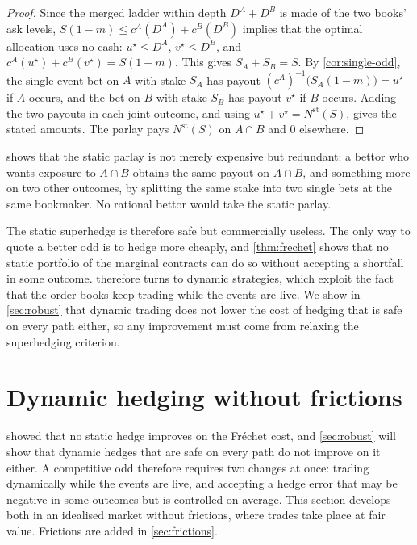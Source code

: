 \documentclass[11pt,a4paper]{article}
\theoremstyle{plain}
\theoremstyle{definition}
\theoremstyle{remark}
\newcommand{\1}{\mathbf{1}}
\begin{document}
\begin{proof}
Since the merged ladder within depth $D^A+D^B$ is made of the two books' ask levels, $S(1-m)\leq c^A(D^A)+c^B(D^B)$ implies that the optimal allocation uses no cash: $u^\star\leq D^A$, $v^\star\leq D^B$, and $c^A(u^\star) + c^B(v^\star) = S(1-m)$. This gives $S_A+S_B = S$. By \cref{cor:single-odd}, the single-event bet on $A$ with stake $S_A$ has payout $(c^A)^{-1}\bigl(S_A(1-m)\bigr) = u^\star$ if $A$ occurs, and the bet on $B$ with stake $S_B$ has payout $v^\star$ if $B$ occurs. Adding the two payouts in each joint outcome, and using $u^\star+v^\star = N^{\mathrm{st}}(S)$, gives the stated amounts. The parlay pays $N^{\mathrm{st}}(S)$ on $A\cap B$ and $0$ elsewhere.
\end{proof}

 shows that the static parlay is not merely expensive but redundant: a bettor who wants exposure to $A\cap B$ obtains the same payout on $A\cap B$, and something more on two other outcomes, by splitting the same stake into two single bets at the same bookmaker. No rational bettor would take the static parlay.

The static superhedge is therefore safe but commercially useless. The only way to quote a better odd is to hedge more cheaply, and \cref{thm:frechet} shows that no static portfolio of the marginal contracts can do so without accepting a shortfall in some outcome.  therefore turns to dynamic strategies, which exploit the fact that the order books keep trading while the events are live. We show in \cref{sec:robust} that dynamic trading does not lower the cost of hedging that is safe on every path either, so any improvement must come from relaxing the superhedging criterion.

\section{Dynamic hedging without frictions}
\label{sec:dynamic}
 showed that no static hedge improves on the Fréchet cost, and \cref{sec:robust} will show that dynamic hedges that are safe on every path do not improve on it either. A competitive odd therefore requires two changes at once: trading dynamically while the events are live, and accepting a hedge error that may be negative in some outcomes but is controlled on average. This section develops both in an idealised market without frictions, where trades take place at fair value. Frictions are added in \cref{sec:frictions}.
\end{document}
